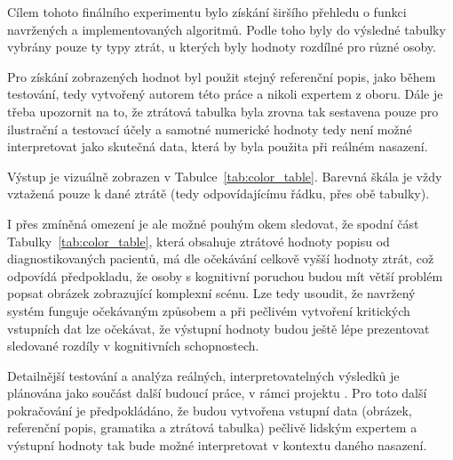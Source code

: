 Cílem tohoto finálního experimentu bylo získání širšího přehledu o funkci navržených a implementovaných algoritmů.
Podle toho byly do výsledné tabulky vybrány pouze ty typy ztrát, u kterých byly hodnoty rozdílné pro různé osoby.

Pro získání zobrazených hodnot byl použit stejný referenční popis, jako během testování, tedy vytvořený autorem této práce a nikoli expertem z oboru.
Dále je třeba upozornit na to, že ztrátová tabulka byla zrovna tak sestavena pouze pro ilustrační a testovací účely a samotné numerické hodnoty
tedy není možné interpretovat jako skutečná data, která by byla použita při reálném nasazení.

Výstup je vizuálně zobrazen v Tabulce~\ref{tab:color_table}.
Barevná škála je vždy vztažená pouze k dané ztrátě (tedy odpovídajícímu řádku, přes obě tabulky).

I přes zmíněná omezení je ale možné pouhým okem sledovat, že spodní část Tabulky~\ref{tab:color_table},
která obsahuje ztrátové hodnoty popisu od diagnostikovaných pacientů, má dle očekávání celkově vyšší hodnoty ztrát,
což odpovídá předpokladu, že osoby s kognitivní poruchou budou mít větší problém popsat obrázek zobrazující komplexní scénu.
Lze tedy usoudit, že navržený systém funguje očekávaným způsobem a při pečlivém vytvoření kritických vstupních dat lze očekávat,
že výstupní hodnoty budou ještě lépe prezentovat sledované rozdíly v kognitivních schopnostech.

Detailnější testování a analýza reálných, interpretovatelných výsledků je plánována jako součást další budoucí práce, v rámci projektu \projekt.
Pro toto další pokračování je předpokládáno, že budou vytvořena vstupní data (obrázek, referenční popis, gramatika a ztrátová tabulka)
pečlivě lidským expertem a výstupní hodnoty tak bude možné interpretovat v kontextu daného nasazení.


